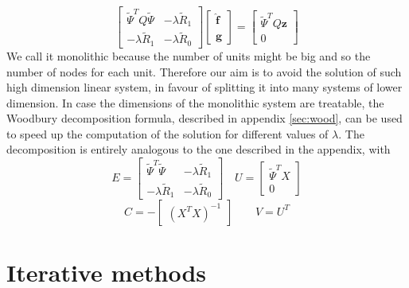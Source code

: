 \begin{equation}
    \label{mono}
    \begin{bmatrix}
        \tilde{\Psi}^TQ\tilde{\Psi} & -\lambda \tilde{R}_1\\
        -\lambda \tilde{R}_1  & -\lambda \tilde{R}_0
    \end{bmatrix}
    \begin{bmatrix}
        \hat{\mathbf{f}}\\
        \hat{\mathbf{g}}
    \end{bmatrix}
    = 
    \begin{bmatrix}
        \tilde{\Psi}^T Q\mathbf{z}\\
        0
    \end{bmatrix}
\end{equation}
We call it monolithic because the number of units might be big and so the number of nodes for each unit. Therefore our aim is to avoid the solution of such high dimension linear system, in favour of splitting it into many systems of lower dimension.
In case the dimensions of the monolithic system are treatable, the Woodbury decomposition formula, described in appendix \ref{sec:wood}, can be used to speed up the computation of the solution for different values of $\lambda$. The decomposition is entirely analogous to the one described in the appendix, with
\begin{equation}
    \label{eq:wootilde}
    E =
    \begin{bmatrix}
        \tilde{\Psi}^T\tilde{\Psi} & -\lambda \tilde{R}_1\\
        -\lambda \tilde{R}_1  & -\lambda \tilde{R}_0
    \end{bmatrix}
\quad
    U = 
    \begin{bmatrix}
        \tilde{\Psi}^TX\\
        0
    \end{bmatrix}
\end{equation}
\begin{equation*}
    C = -
    \begin{bmatrix}
        (X^TX)^{-1}
    \end{bmatrix}
\quad \quad
    V = U^T
\end{equation*}

\section{Iterative methods}

